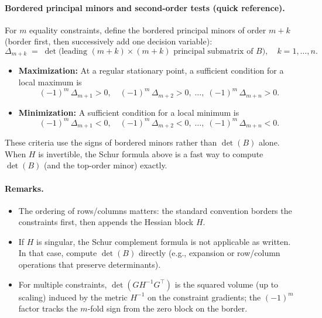 \documentclass[12pt]{article}
\begin{document}
\paragraph{Bordered principal minors and second-order tests (quick reference).}
For \(m\) equality constraints, define the bordered principal minors of order \(m+k\) (border first, then successively add one decision variable):
\[
\Delta_{m+k} \;=\; \det\bigl(\text{leading }(m+k)\times(m+k)\text{ principal submatrix of }B\bigr),
\quad k=1,\ldots,n.
\]
\begin{itemize}
\item \textbf{Maximization:} At a regular stationary point, a sufficient condition for a local maximum is
\[
(-1)^m\,\Delta_{m+1}>0,\quad (-1)^m\,\Delta_{m+2}>0,\;\ldots,\;(-1)^m\,\Delta_{m+n}>0.
\]
\item \textbf{Minimization:} A sufficient condition for a local minimum is
\[
(-1)^m\,\Delta_{m+1}<0,\quad (-1)^m\,\Delta_{m+2}<0,\;\ldots,\;(-1)^m\,\Delta_{m+n}<0.
\]
\end{itemize}
These criteria use the signs of bordered minors rather than \(\det(B)\) alone. When \(H\) is invertible, the Schur formula above is a fast way to compute \(\det(B)\) (and the top-order minor) exactly.

\paragraph{Remarks.}
\begin{itemize}
\item The ordering of rows/columns matters: the standard convention borders the constraints first, then appends the Hessian block \(H\).
\item If \(H\) is singular, the Schur complement formula is not applicable as written. In that case, compute \(\det(B)\) directly (e.g., expansion or row/column operations that preserve determinants).
\item For multiple constraints, \(\det(GH^{-1}G^\top)\) is the squared volume (up to scaling) induced by the metric \(H^{-1}\) on the constraint gradients; the \((-1)^m\) factor tracks the $m$-fold sign from the zero block on the border.
\end{itemize}
\end{document}
